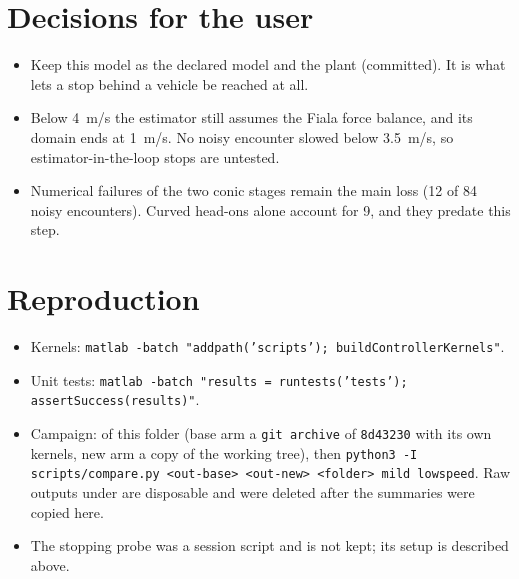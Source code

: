 \documentclass[11pt]{article}
\begin{document}
\section{Decisions for the user}
\begin{itemize}
\item Keep this model as the declared model and the plant (committed). It is
  what lets a stop behind a vehicle be reached at all.
\item Below 4~m/s the estimator still assumes the Fiala force balance, and
  its domain ends at 1~m/s. No noisy encounter slowed below 3.5~m/s, so
  estimator-in-the-loop stops are untested.
\item Numerical failures of the two conic stages remain the main loss (12
  of 84 noisy encounters). Curved head-ons alone account for 9, and they
  predate this step.
\end{itemize}

\section{Reproduction}
\begin{itemize}
\item Kernels: \texttt{matlab -batch "addpath('scripts'); buildControllerKernels"}.
\item Unit tests: \texttt{matlab -batch "results = runtests('tests'); assertSuccess(results)"}.
\item Campaign:  of this folder (base arm
  a \texttt{git archive} of \texttt{8d43230} with its own kernels, new arm a
  copy of the working tree), then
  \texttt{python3 -I scripts/compare.py <out-base> <out-new> <folder> mild lowspeed}.
  Raw outputs under 
  are disposable and were deleted after the summaries were copied here.
\item The stopping probe was a session script and is not kept; its setup is
  described above.
\end{itemize}
\end{document}
